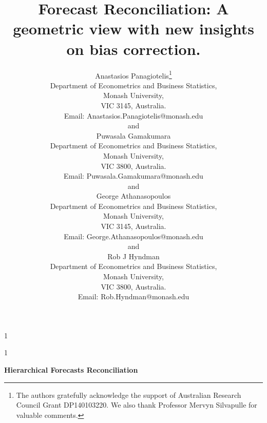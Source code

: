 \documentclass[12pt]{article}
\newcommand{\blind}{1}
\theoremstyle{definition}
\theoremstyle{property}
\begin{document}
	
	
	
	\def\spacingset#1{\renewcommand{\baselinestretch}%
		{#1}\small\normalsize} \spacingset{1}
	
	
	
	\blind
	{
		\title{\bf Forecast Reconciliation: A geometric view with new insights on bias correction.}
		\author{Anastasios Panagiotelis\thanks{
				The authors gratefully acknowledge the support of Australian Research Council Grant DP140103220.  We also thank Professor Mervyn Silvapulle for valuable comments.}\hspace{.2cm}\\
			Department of Econometrics and Business Statistics,\\
			Monash University,\\ VIC 3145, Australia.\\
			Email: Anastasios.Panagiotelis@monash.edu \\
			and \\
			Puwasala Gamakumara\\
			Department of Econometrics and Business Statistics,\\
			Monash University,\\ VIC 3800, Australia.\\
			Email: Puwasala.Gamakumara@monash.edu \\
			and \\
			George Athanasopoulos\\
			Department of Econometrics and Business Statistics,\\
			Monash University,\\ VIC 3145, Australia.\\
			Email: George.Athanasopoulos@monash.edu \\
			and \\
			Rob J Hyndman\\
			Department of Econometrics and Business Statistics,\\
			Monash University,\\ VIC 3800, Australia.\\
			Email: Rob.Hyndman@monash.edu \\}
		\maketitle
	} \fi
	
	\blind
	{
		\bigskip
		\bigskip
		\bigskip
		\begin{center}
			{\LARGE\bf Hierarchical Forecasts Reconciliation}
		\end{center}
		\medskip
	} \fi
	
\end{document}
